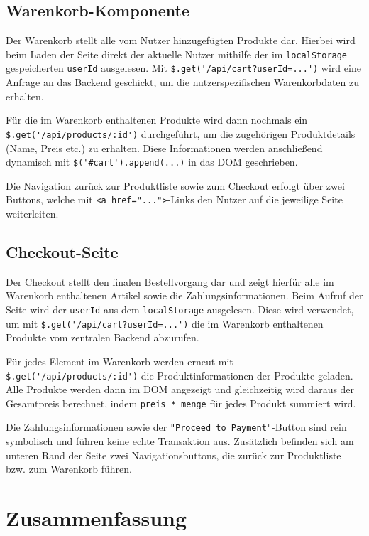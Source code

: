 \documentclass[oneside]{ausarbeitung}
\begin{document}
\subsection{Warenkorb-Komponente}

Der Warenkorb stellt alle vom Nutzer hinzugefügten Produkte dar. Hierbei wird beim Laden der Seite direkt der aktuelle Nutzer mithilfe der im \texttt{localStorage} gespeicherten \texttt{userId} ausgelesen. Mit \verb|$.get('/api/cart?userId=...')| wird eine Anfrage an das Backend geschickt, um die nutzerspezifischen Warenkorbdaten zu erhalten.

Für die im Warenkorb enthaltenen Produkte wird dann nochmals ein \verb|$.get('/api/products/:id')| durchgeführt, um die zugehörigen Produktdetails (Name, Preis etc.) zu erhalten. Diese Informationen werden anschließend dynamisch mit \verb|$('#cart').append(...)| in das DOM geschrieben.

Die Navigation zurück zur Produktliste sowie zum Checkout erfolgt über zwei Buttons, welche mit \texttt{<a href="...">}-Links den Nutzer auf die jeweilige Seite weiterleiten.


\subsection{Checkout-Seite}

Der Checkout stellt den finalen Bestellvorgang dar und zeigt hierfür alle im Warenkorb enthaltenen Artikel sowie die Zahlungsinformationen. Beim Aufruf der Seite wird der \texttt{userId} aus dem \texttt{localStorage} ausgelesen. Diese wird verwendet, um mit \verb|$.get('/api/cart?userId=...')| die im Warenkorb enthaltenen Produkte vom zentralen Backend abzurufen. 

Für jedes Element im Warenkorb werden erneut mit \verb|$.get('/api/products/:id')| die Produktinformationen der Produkte geladen. Alle Produkte werden dann im DOM angezeigt und gleichzeitig wird daraus der Gesamtpreis berechnet, indem \texttt{preis * menge} für jedes Produkt summiert wird. 

Die Zahlungsinformationen sowie der \texttt{"Proceed to Payment"}-Button sind rein symbolisch und führen keine echte Transaktion aus. Zusätzlich befinden sich am unteren Rand der Seite zwei Navigationsbuttons, die zurück zur Produktliste bzw. zum Warenkorb führen.

\section{Zusammenfassung}
\end{document}
